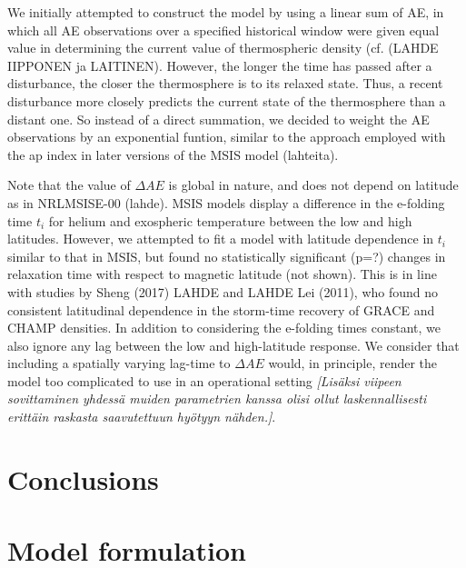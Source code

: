 \documentclass[referee,a4paper,12pt,traditabstract]{swsc}
\begin{document}
\begin{linenumbers}
We initially attempted to construct the model by using a linear sum of AE, in which all AE observations over a specified historical window were given equal value in determining the current value of thermospheric density (cf. (LAHDE IIPPONEN ja LAITINEN). However, the longer the time has passed after a disturbance, the closer the thermosphere is to its relaxed state. Thus, a recent disturbance more closely predicts the current state of the thermosphere than a distant one. So instead of a direct summation, we decided to weight the AE observations by an exponential funtion, similar to the approach employed with the ap index in later versions of the MSIS model (lahteita). 

Note that the value of $\Delta AE$ is global in nature, and does not depend on latitude as in NRLMSISE-00 (lahde). MSIS models display a difference in the e-folding time $t_i$ for helium and exospheric temperature between the low and high latitudes. However, we attempted to fit a model with latitude dependence in $t_i$ similar to that in MSIS, but found no statistically significant (p=?) changes in relaxation time with respect to magnetic latitude (not shown). This is in line with studies by Sheng (2017) LAHDE and LAHDE Lei (2011), who found no consistent latitudinal dependence in the storm-time recovery of GRACE and CHAMP densities. In addition to considering the e-folding times constant, we also ignore any lag between the low and high-latitude response. We consider that including a spatially varying lag-time to $\Delta AE$ would, in principle, render the model too complicated to use in an operational setting \textit{[Lis\"aksi viipeen sovittaminen yhdess\"a muiden parametrien kanssa olisi ollut laskennallisesti eritt\"ain raskasta saavutettuun hy\"otyyn n\"ahden.]}.





\section{Conclusions}





\begin{acknowledgements}

\end{acknowledgements}

\appendix
\section{Model formulation}


\end{linenumbers}
\end{document}
